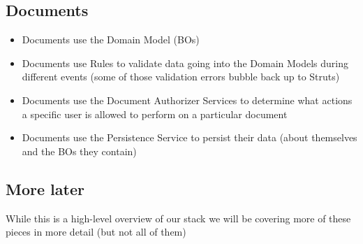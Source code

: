\begin{ifhtml}
\begin{s5slide}
        \section{Documents}
            \begin{itemize}
                \item Documents use the Domain Model (BOs)
                \item Documents use Rules to validate data going into the Domain Models during different events (some of those validation errors bubble back up to Struts)
                \item Documents use the Document Authorizer Services to determine what actions a specific user is allowed to perform on a particular document
                \item Documents use the Persistence Service to persist their data (about themselves and the BOs they contain)
            \end{itemize}
    \end{s5slide}
    \begin{s5slide}
        \section{More later}
            While this is a high-level overview of our stack we will be covering more of these pieces in more detail (but not all of them)
    \end{s5slide}
\end{ifhtml}